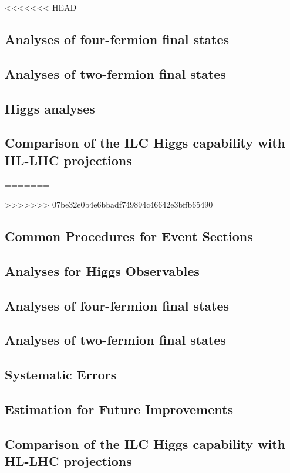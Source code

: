 

<<<<<<< HEAD
\subsection{Analyses of four-fermion final states} 


\subsection{Analyses of two-fermion final states}


\subsection{Higgs analyses}



\subsection{Comparison of the ILC Higgs capability with 
HL-LHC projections}
=======


>>>>>>> 07be32e0b4e6bbadf749894c46642e3bffb65490

\subsection{Common Procedures for Event Sections}



\subsection{Analyses for Higgs Observables}


\subsection{Analyses of four-fermion final states} 


\subsection{Analyses of two-fermion final states}


\subsection{Systematic Errors}



\subsection{Estimation for Future Improvements}



\subsection{Comparison of the ILC Higgs capability with 
HL-LHC projections}



